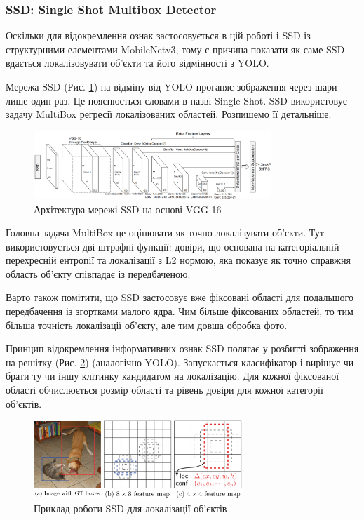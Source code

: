 \subsubsection{SSD: Single Shot Multibox Detector}

Оскільки для відокремлення ознак застосовується в цій роботі і SSD із
структурними елементами MobileNetv3, тому є причина показати як саме SSD вдається
локалізовувати об'єкти та його відмінності з YOLO.

Мережа SSD (Рис. \ref{fig:cnn:ssd_architecture}) на відміну від YOLO проганяє зображення
через шари лише один раз. Це пояснюється словами в назві Single Shot. SSD
використовує задачу MultiBox регресії
локалізованих областей. Розпишемо її детальніше.

\begin{figure}[H]
    \centering
    \includegraphics[width=0.8\textwidth]{images/cnn_ssd_architecture}
    \caption{Архітектура мережі SSD на основі VGG-16    \cite{ssd}
        \label{fig:cnn:ssd_architecture}
    }
\end{figure}

Головна задача MultiBox це оцінювати як точно локалізувати об'єкти. Тут використовується
дві штрафні функції: довіри, що основана на категоріальній перехресній ентропії та
локалізації з L2 нормою, яка показує як точно справжня область об'єкту співпадає
із передбаченою.

Варто також помітити, що SSD застосовує вже фіксовані області для подальшого передбачення
із згортками малого ядра.
Чим більше фіксованих областей, то тим більша точність локалізації об'єкту,
але тим довша обробка фото.

Принцип відокремлення інформативних ознак SSD полягає у розбитті зображення на решітку
(Рис. \ref{fig:cnn:ssd_work_example}) (аналогічно YOLO). Запускається класифікатор
і вирішує чи брати ту чи іншу клітинку
кандидатом на локалізацію. Для кожної фіксованої області обчислюється розмір
області та рівень довіри для кожної категорії об'єктів.

\begin{figure}[H]
    \centering
    \includegraphics[width=0.7\textwidth]{images/cnn_ssd_work_example}
    \caption{Приклад роботи SSD для локалізації об'єктів \cite{ssd}
        \label{fig:cnn:ssd_work_example}
    }
\end{figure}


